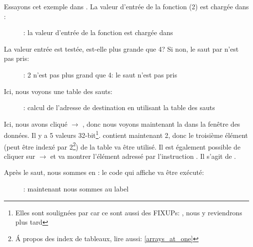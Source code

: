 ﻿\clearpage
\mysubparagraph{\olly}
\myindex{\olly}

Essayons cet exemple dans \olly.
La valeur d'entrée de la fonction (2) est chargée dans \EAX:

\begin{figure}[H]
\centering
{}
\caption{\olly: la valeur d'entrée de la fonction est chargée dans \EAX}
\label{fig:switch_lot_olly1}
\end{figure}

\clearpage
La valeur entrée est testée, est-elle plus grande que 4?
Si non, le saut par  n'est pas pris:
\begin{figure}[H]
\centering
{}
\caption{\olly: 2 n'est pas plus grand que 4: le saut n'est pas pris}
\label{fig:switch_lot_olly2}
\end{figure}

\clearpage
Ici, nous voyons une table des sauts:

\begin{figure}[H]
\centering
{}
\caption{\olly: calcul de l'adresse de destination en utilisant la table des sauts}
\label{fig:switch_lot_olly3}
\end{figure}

Ici, nous avons cliqué  $\rightarrow$ , donc
nous voyons maintenant la  dans la fenêtre des données.
Il y a 5 valeurs 32-bit\footnote{Elles sont soulignées par \olly car ce sont aussi
des FIXUPs: , nous y reviendrons plus tard}.
\ECX contient maintenant 2, donc le troisième élément (peut être indexé par 2\footnote{Á
propos des index de tableaux, lire aussi: \ref{arrays_at_one}}) de la table va être
utilisé.
Il est également possible de cliquer sur  $\rightarrow$  et \olly va montrer l'élément adressé par l'instruction \JMP.
Il s'agit de .

\clearpage
Après le saut, nous sommes en : le code qui affiche  va être
exécuté:

\begin{figure}[H]
\centering
{}
\caption{\olly: maintenant nous sommes au  label}
\label{fig:switch_lot_olly4}
\end{figure}
